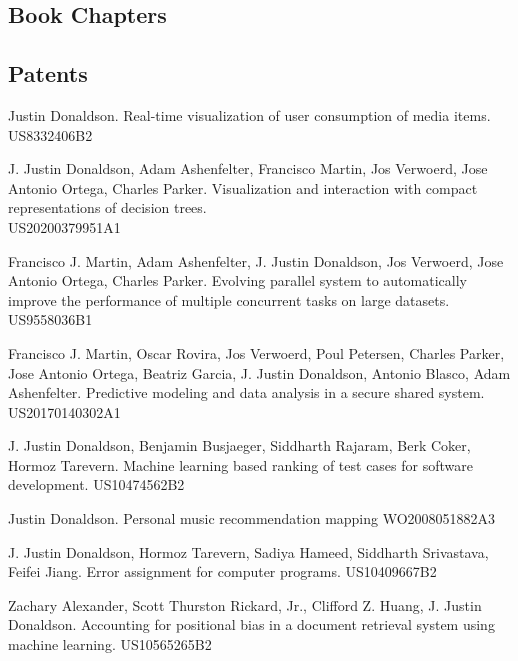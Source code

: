 \documentclass[margin,line]{res}
\let\resumesection\section
\begin{document}
\begin{resume}
\section{\sc Book Chapters}
\renewcommand{\section}[2]{}
\renewcommand{\section}{\resumesection}

\subsection{\bf Patents}

Justin Donaldson. Real-time visualization of user consumption of media items. US8332406B2

J. Justin Donaldson, Adam Ashenfelter, Francisco Martin, Jos Verwoerd, Jose Antonio Ortega, Charles Parker. Visualization and interaction with compact representations of decision trees. \\US20200379951A1

Francisco J. Martin, Adam Ashenfelter, J. Justin Donaldson, Jos Verwoerd, Jose Antonio Ortega, Charles Parker.  Evolving parallel system to automatically improve the performance of multiple concurrent tasks on large datasets. US9558036B1

Francisco J. Martin, Oscar Rovira,  Jos Verwoerd, Poul Petersen, Charles Parker, Jose Antonio Ortega, Beatriz Garcia, J. Justin Donaldson, Antonio Blasco, Adam Ashenfelter. Predictive modeling and data analysis in a secure shared system. US20170140302A1

J. Justin Donaldson, Benjamin Busjaeger, Siddharth Rajaram, Berk Coker, Hormoz Tarevern. Machine learning based ranking of test cases for software development. US10474562B2

Justin Donaldson. Personal music recommendation mapping WO2008051882A3

J. Justin Donaldson, Hormoz Tarevern, Sadiya Hameed, Siddharth Srivastava, Feifei Jiang. Error assignment for computer programs. US10409667B2

Zachary Alexander, Scott Thurston Rickard, Jr., Clifford Z. Huang, J. Justin Donaldson. Accounting for positional bias in a document retrieval system using machine learning. US10565265B2


\end{resume}
\end{document}
